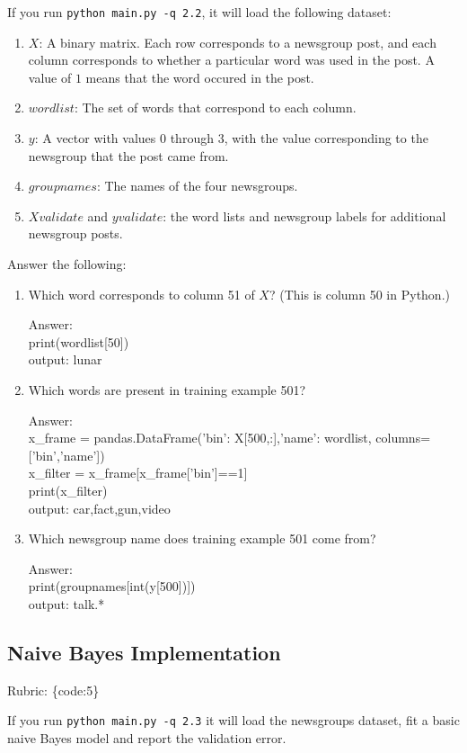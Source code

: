 \documentclass{article}
\def\rubric#1{\gre{Rubric: \{#1\}}}{}
\def\ans#1{\par\gre{Answer: #1}}
\def\blu#1{{\color{blu}#1}}
\def\gre#1{{\color{gre}#1}}
\def\enum#1{\begin{enumerate}#1\end{enumerate}}
\begin{document}
If you run \texttt{python main.py -q 2.2}, it will load the following dataset:
\enum{
\item $X$: A binary matrix. Each row corresponds to a newsgroup post, and each column corresponds to whether a particular word was used in the post. A value of $1$ means that the word occured in the post.
\item $wordlist$: The set of words that correspond to each column.
\item $y$: A vector with values $0$ through $3$, with the value corresponding to the newsgroup that the post came from.
\item $groupnames$: The names of the four newsgroups.
\item $Xvalidate$ and $yvalidate$: the word lists and newsgroup labels for additional newsgroup posts.
}
\blu{Answer the following}:
\enum{
\item Which word corresponds to column 51 of $X$? (This is column 50 in Python.)
\ans{
	\\print(wordlist[50]) 
	\\output: lunar}
\item Which words are present in training example 501?
\ans{
	\\x\_frame = pandas.DataFrame({'bin': X[500,:],'name': wordlist},
	columns=['bin','name'])
	\\x\_filter = x\_frame[x\_frame['bin']==1]
	\\print(x\_filter) 
	\\output: car,fact,gun,video}
\item Which newsgroup name does training example 501 come from?
\ans{
	\\print(groupnames[int(y[500])])
	\\output: talk.*}
}

\subsection{Naive Bayes Implementation}
\rubric{code:5}

If you run \texttt{python main.py -q 2.3}
it will load the newsgroups dataset, fit a basic naive Bayes model and report the validation error.
\end{document}

